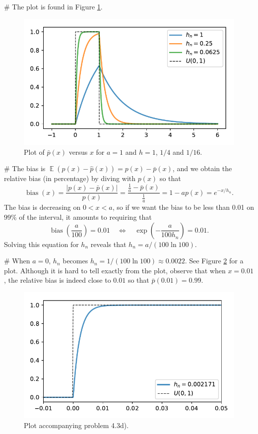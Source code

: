 \documentclass[12pt, a4paper]{article}
\newcommand{\abs}[1]{\left\lvert#1\right\rvert}
\DeclareMathOperator{\E}{\mathbb{E}}
\begin{document}
\begin{easylist}[enumerate]
 
# The plot is found in Figure \ref{fig:duda_ch4_prob3_b}.
\begin{figure}[ht!]
\centering
\includegraphics[width=0.5\linewidth]{figs/duda_ch4_prob3_b}
\caption{Plot of $\bar{p}(x)$ versus $x$ for $a=1$ and $h=1$, $1/4$ and $1/16$.}
\label{fig:duda_ch4_prob3_b}
\end{figure}

# The bias is $\E(p(x) - \hat{p}(x)) = p(x) - \bar{p}(x)$, and we obtain the relative bias (in percentage) by diving with $p(x)$ so that
\begin{equation*}
	\operatorname{bias}(x) = \frac{\abs{p(x) - \bar{p}(x)}}{p(x)}
	= \frac{\frac{1}{a} - \bar{p}(x)}{\frac{1}{a}} = 1 - ap(x) = e^{-x / h_n}.
\end{equation*}
The bias is decreasing on $0 < x < a$, so if we want the bias to be less than 0.01 on $99\%$ of the interval, it amounts to requiring that
\begin{equation*}
	\operatorname{bias} \left( \frac{a}{100} \right) = 0.01 
	\quad \Leftrightarrow \quad \exp \left( - \frac{a}{100 h_n} \right) = 0.01.
\end{equation*}
Solving this equation for $h_n$ reveals that $h_n = a / (100 \ln 100)$.


# When $a=0$, $h_n$ becomes $h_n = 1 / (100 \ln 100) \approx 0.0022$.
See Figure \ref{fig:duda_ch4_prob3_d} for a plot.
Although it is hard to tell exactly from the plot, observe that when $x = 0.01$, the relative bias is indeed close to $0.01$ so that $\bar{p}(0.01) = 0.99$.


\begin{figure}[ht!]
\centering
\includegraphics[width=0.5\linewidth]{figs/duda_ch4_prob3_d}
\caption{Plot accompanying problem 4.3d).}
\label{fig:duda_ch4_prob3_d}
\end{figure}

\end{easylist}
\end{document}
